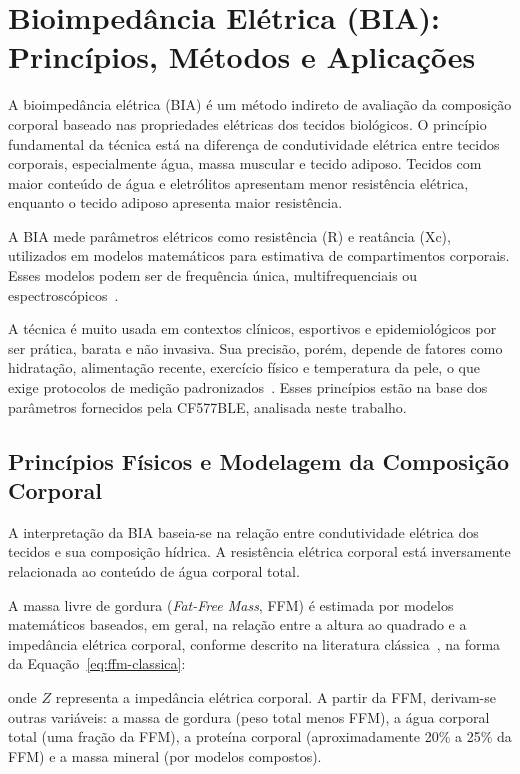 \section{Bioimpedância Elétrica (BIA): Princípios, Métodos e Aplicações}

A bioimpedância elétrica (BIA) é um método indireto de avaliação da composição
corporal baseado nas propriedades elétricas dos tecidos biológicos. O princípio
fundamental da técnica está na diferença de condutividade elétrica entre tecidos
corporais, especialmente água, massa muscular e tecido adiposo. Tecidos com maior
conteúdo de água e eletrólitos apresentam menor resistência elétrica, enquanto o
tecido adiposo apresenta maior resistência.

A BIA mede parâmetros elétricos como resistência (R) e reatância (Xc), utilizados em
modelos matemáticos para estimativa de compartimentos corporais. Esses modelos podem
ser de frequência única, multifrequenciais ou espectroscópicos~\cite{kyle2004,lukaski1986}.

A técnica é muito usada em contextos clínicos, esportivos e epidemiológicos por ser
prática, barata e não invasiva. Sua precisão, porém, depende de fatores como
hidratação, alimentação recente, exercício físico e temperatura da pele, o que exige
protocolos de medição padronizados~\cite{espen2025,sossou2022}. Esses princípios estão
na base dos parâmetros fornecidos pela CF577BLE, analisada neste trabalho.

\subsection{Princípios Físicos e Modelagem da Composição Corporal}
\label{sec:principios}

A interpretação da BIA baseia-se na relação entre condutividade elétrica dos tecidos e
sua composição hídrica. A resistência elétrica corporal está inversamente relacionada
ao conteúdo de água corporal total.

A massa livre de gordura (\emph{Fat-Free Mass}, FFM) é estimada por modelos
matemáticos baseados, em geral, na relação entre a altura ao quadrado e a impedância
elétrica corporal, conforme descrito na literatura clássica~\cite{kushner1992,kyle2004},
na forma da Equação~\ref{eq:ffm-classica}:


\noindent onde $Z$ representa a impedância elétrica corporal. A partir da FFM,
derivam-se outras variáveis: a massa de gordura (peso total menos FFM), a água
corporal total (uma fração da FFM), a proteína corporal (aproximadamente 20\% a 25\%
da FFM) e a massa mineral (por modelos compostos).

